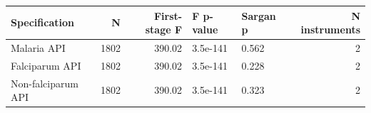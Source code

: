 {\small

\begin{tabular}[t]{lrrllr}
\toprule
Specification & N & First-stage F & F p-value & Sargan p & N instruments\\
\midrule
Malaria API & 1802 & 390.02 & 3.5e-141 & 0.562 & 2\\
Falciparum API & 1802 & 390.02 & 3.5e-141 & 0.228 & 2\\
Non-falciparum API & 1802 & 390.02 & 3.5e-141 & 0.323 & 2\\
\bottomrule
\end{tabular}
}
